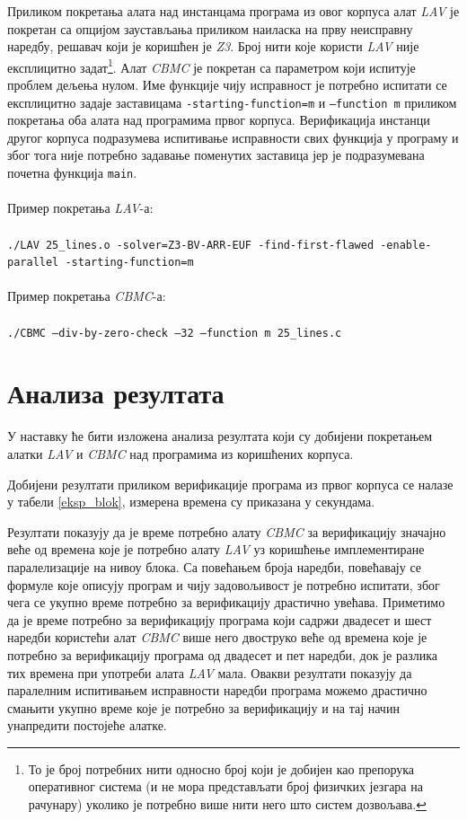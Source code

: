 \documentclass[12pt,oneside]{memoir}
\begin{document}
Приликом покретања алата над инстанцама програма из овог корпуса алат \textit{LAV} је покретан са опцијом заустављања приликом наиласка на прву неисправну наредбу, решавач који је коришћен је \textit{Z3}. Број нити које користи \textit{LAV} није експлицитно задат\footnote{То је број потребних нити односно број који је добијен као препорука оперативног система (и не мора представљати број физичких језгара на рачунару) уколико је потребно више нити него што систем дозвољава.}. Алат \textit{CBMC} је покретан са параметром који испитује проблем дељења нулом. Име функције чију исправност је потребно испитати се експлицитно задаје заставицама \texttt{-starting-function=m} и \texttt{--function m} приликом покретања оба алата над програмима првог корпуса. Верификација инстанци другог корпуса подразумева испитивање исправности свих функција у програму и због тога није потребно задавање поменутих заставица јер је подразумевана почетна функција \texttt{main}.
\\ \\
Пример покретања \textit{LAV}-а:
\\ \\
\texttt{./LAV 25\_lines.o -solver=Z3-BV-ARR-EUF -find-first-flawed -enable-parallel -starting-function=m}
\\ \\
Пример покретања \textit{CBMC}-а:
\\ \\
\texttt{./CBMC --div-by-zero-check --32 --function m 25\_lines.c}


  
 \section{Анализа резултата}
	У наставку ће бити изложена анализа резултата који су добијени покретањем алатки \textit{LAV} и \textit{CBMC} над програмима из коришћених корпуса. 	
	
  Добијени резултати приликом верификације програма из првог корпуса се налазе у табели \ref{eksp_blok}, измерена времена су приказана у секундама. 
  
  Резултати показују да је време потребно алату \textit{CBMC} за верификацију значајно веће од времена које је потребно алату \textit{LAV} уз коришћење имплементиране паралелизације на нивоу блока. Са повећањем броја наредби, повећавају се формуле које описују програм и чију задовољивост је потребно испитати, због чега се укупно време потребно за верификацију драстично увећава. Приметимо да је време потребно за верификацију програма који садржи двадесет и шест наредби користећи алат \textit{CBMC} више него двоструко веће од времена које је потребно за верификацију програма од двадесет и пет наредби, док је разлика тих времена при употреби алата \textit{LAV} мала. Овакви резултати показују да паралелним испитивањем исправности наредби програма можемо драстично смањити укупно време које је потребно за верификацију и на тај начин унапредити постојеће алатке.
  
\end{document}
